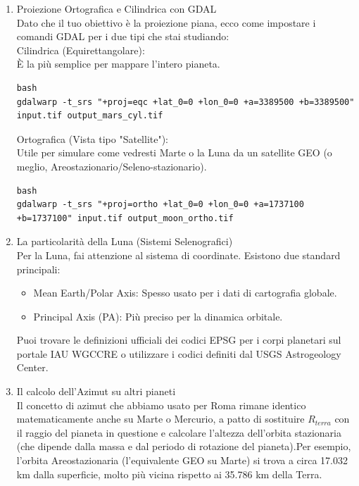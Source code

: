 \documentclass[a4paper,14pt]{article}
\begin{document}
\begin{enumerate}
\item Proiezione Ortografica e Cilindrica con GDAL\\
Dato che il tuo obiettivo è la proiezione piana, ecco come impostare i comandi GDAL per i due tipi che stai studiando:\\
Cilindrica (Equirettangolare): \\
È la più semplice per mappare l'intero pianeta.\\
{
\scriptsize
\begin{verbatim}
bash
gdalwarp -t_srs "+proj=eqc +lat_0=0 +lon_0=0 +a=3389500 +b=3389500" input.tif output_mars_cyl.tif                                                                                                \end{verbatim}
}
Ortografica (Vista tipo "Satellite"):\\
Utile per simulare come vedresti Marte o la Luna da un satellite GEO (o meglio, Areostazionario/Seleno-stazionario).\\
{
\scriptsize
\begin{verbatim}
bash
gdalwarp -t_srs "+proj=ortho +lat_0=0 +lon_0=0 +a=1737100 +b=1737100" input.tif output_moon_ortho.tif                                                                                                     \end{verbatim}
}
\item La particolarità della Luna (Sistemi Selenografici)\\
Per la Luna, fai attenzione al sistema di coordinate. Esistono due standard principali:\\
\begin{itemize}
\item Mean Earth/Polar Axis: Spesso usato per i dati di cartografia globale.
\item Principal Axis (PA): Più preciso per la dinamica orbitale.\\
\end{itemize}
Puoi trovare le definizioni ufficiali dei codici EPSG per i corpi planetari sul portale IAU WGCCRE o utilizzare i codici definiti dal USGS Astrogeology Center.
\item Il calcolo dell'Azimut su altri pianeti\\
Il concetto di azimut che abbiamo usato per Roma rimane identico matematicamente anche su Marte o Mercurio, a patto di sostituire \(R_{terra}\) con il raggio del pianeta in questione e calcolare l'altezza dell'orbita stazionaria (che dipende dalla massa e dal periodo di rotazione del pianeta).Per esempio, l'orbita Areostazionaria (l'equivalente GEO su Marte) si trova a circa 17.032 km dalla superficie, molto più vicina rispetto ai 35.786 km della Terra.\\

\end{enumerate}
\end{document}
